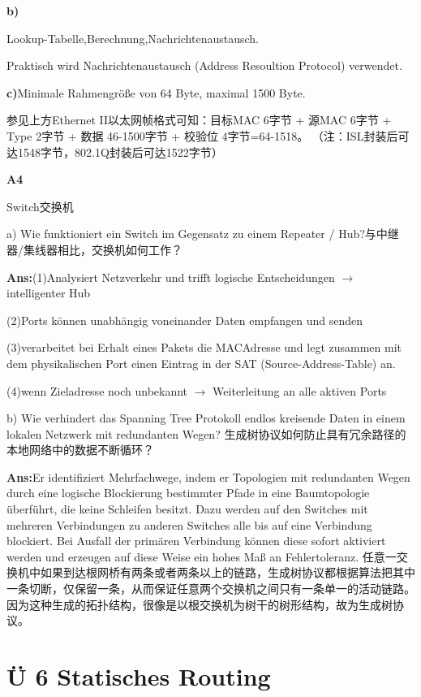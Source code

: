 \documentclass[fleqn]{article}
\begin{document}
\textbf{b)}

Lookup-Tabelle,Berechnung,Nachrichtenaustausch.

Praktisch wird Nachrichtenaustausch (Address Resoultion Protocol) verwendet.

\textbf{c)}Minimale Rahmengröße von 64 Byte, maximal 1500 Byte.

参见上方Ethernet II以太网帧格式可知：目标MAC 6字节 + 源MAC 6字节 + Type 2字节 + 数据 46-1500字节 + 校验位 4字节=64-1518。
（注：ISL封装后可达1548字节，802.1Q封装后可达1522字节）

\noindent\textbf{A4}

Switch交换机

a) Wie funktioniert ein Switch im Gegensatz zu einem Repeater / Hub?与中继器/集线器相比，交换机如何工作？

\textbf{Ans:}(1)Analysiert Netzverkehr und trifft logische Entscheidungen $\rightarrow$ intelligenter Hub

\indent\indent(2)Ports können unabhängig voneinander Daten empfangen und senden

\indent\indent(3)verarbeitet bei Erhalt eines Pakets die MACAdresse und legt zusammen mit dem physikalischen Port einen Eintrag in der SAT (Source-Address-Table) an.

\indent\indent(4)wenn Zieladresse noch unbekannt $\rightarrow$ Weiterleitung an alle aktiven Ports

b) Wie verhindert das Spanning Tree Protokoll endlos kreisende Daten in einem lokalen Netzwerk mit redundanten Wegen?
生成树协议如何防止具有冗余路径的本地网络中的数据不断循环？

\textbf{Ans:}Er identifiziert Mehrfachwege, indem er Topologien mit redundanten Wegen durch eine logische Blockierung bestimmter Pfade in eine Baumtopologie überführt, die keine Schleifen besitzt. Dazu werden auf den Switches mit mehreren Verbindungen zu anderen Switches alle bis auf eine Verbindung blockiert. Bei Ausfall der primären Verbindung können diese sofort aktiviert werden und erzeugen auf diese Weise ein hohes Maß an Fehlertoleranz.
任意一交换机中如果到达根网桥有两条或者两条以上的链路，生成树协议都根据算法把其中一条切断，仅保留一条，从而保证任意两个交换机之间只有一条单一的活动链路。因为这种生成的拓扑结构，很像是以根交换机为树干的树形结构，故为生成树协议。

\section{Ü 6 Statisches Routing}
\end{document}
